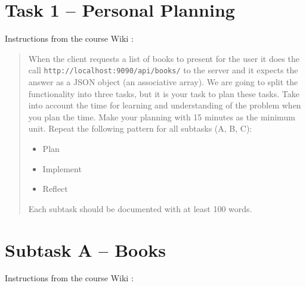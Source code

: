 %
%
%
%


\section{Task 1 -- Personal Planning}
Instructions from the course Wiki \cite{1dv600:lab1:instructions}:

\begin{quote}
  When the client requests a list of books to present for the user it does the
  call \texttt{http://localhost:9090/api/books/} to the server and it expects
  the answer as a JSON object (an associative array). We are going to split the
  functionality into three tasks, but it is your task to plan these tasks. Take
  into account the time for learning and understanding of the problem when you
  plan the time. Make your planning with 15 minutes as the minimum unit. Repeat
  the following pattern for all subtasks (A, B, C):
  
  \begin{itemize}
    \item Plan
    \item Implement
    \item Reflect
  \end{itemize}
  
  Each subtask should be documented with at least 100 words.
\end{quote}


\section{Subtask A -- Books}\label{task-1a}
Instructions from the course Wiki \cite{1dv600:lab1:instructions}:

